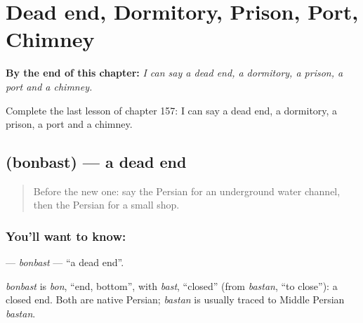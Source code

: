 
\chapter{Dead end, Dormitory, Prison, Port, Chimney}
\label{ch:fa-dead-end-dormitory-prison-port-chimney}

\begin{chapteropening}
\textbf{By the end of this chapter:} \emph{I can say a dead end, a dormitory, a prison, a port and a chimney.}

Complete the last lesson of chapter 157: I can say a dead end, a dormitory, a prison, a port and a chimney.
\end{chapteropening}

\section[\texorpdfstring{\fa{بنبست} (bonbast)}{بنبست (bonbast)}]{ (bonbast) — a dead end}

\label{lesson:FA-C157-bonbast}



\begin{quote}
Before the new one: say the Persian for an underground water channel, then the Persian for a small shop.
\end{quote}

\subsection*{You'll want to know: }
\textbf{} — \emph{bonbast} — \textquotedblleft{}a dead end\textquotedblright{}.

\begin{cousinweb}
\emph{bonbast} is \emph{bon}, \textquotedblleft{}end, bottom\textquotedblright{}, with \emph{bast}, \textquotedblleft{}closed\textquotedblright{} (from \emph{bastan}, \textquotedblleft{}to close\textquotedblright{}): a closed end. Both are native Persian; \emph{bastan} is usually traced to Middle Persian \emph{bastan}.
\end{cousinweb}

